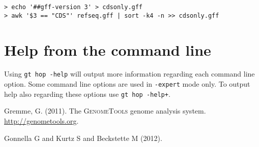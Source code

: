 \documentclass[12pt,titlepage]{article}
\begin{document}
\begin{footnotesize}
\begin{verbatim}
> echo '##gff-version 3' > cdsonly.gff
> awk '$3 == "CDS"' refseq.gff | sort -k4 -n >> cdsonly.gff
\end{verbatim}
\end{footnotesize}

\section{Help from the command line}

Using \texttt{gt hop -help} will output more information regarding
each command line option. Some command line options are used in
\texttt{-expert} mode only. To output help also regarding these
options use \texttt{gt hop -help+}.

\begin{thebibliography}{1}

Gremme, G. (2011).
\newblock The \textsc{GenomeTools} genome analysis system.
  \url{http://genometools.org}.

Gonnella G and Kurtz S and Beckstette M (2012).

\end{thebibliography}
\end{document}

